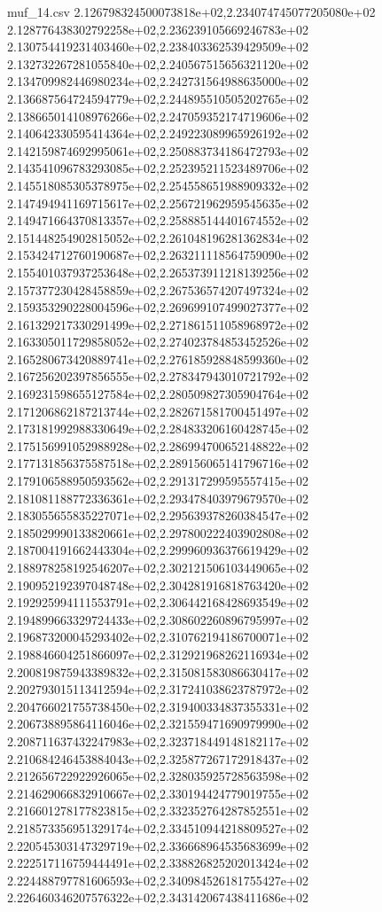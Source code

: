 \begin{filecontents*}{muf_14.csv}
2.126798324500073818e+02,2.234074745077205080e+02
2.128776438302792258e+02,2.236239105669246783e+02
2.130754419231403460e+02,2.238403362539429509e+02
2.132732267281055840e+02,2.240567515656321120e+02
2.134709982446980234e+02,2.242731564988635000e+02
2.136687564724594779e+02,2.244895510505202765e+02
2.138665014108976266e+02,2.247059352174719606e+02
2.140642330595414364e+02,2.249223089965926192e+02
2.142159874692995061e+02,2.250883734186472793e+02
2.143541096783293085e+02,2.252395211523489706e+02
2.145518085305378975e+02,2.254558651988909332e+02
2.147494941169715617e+02,2.256721962959545635e+02
2.149471664370813357e+02,2.258885144401674552e+02
2.151448254902815052e+02,2.261048196281362834e+02
2.153424712760190687e+02,2.263211118564759090e+02
2.155401037937253648e+02,2.265373911218139256e+02
2.157377230428458859e+02,2.267536574207497324e+02
2.159353290228004596e+02,2.269699107499027377e+02
2.161329217330291499e+02,2.271861511058968972e+02
2.163305011729858052e+02,2.274023784853452526e+02
2.165280673420889741e+02,2.276185928848599360e+02
2.167256202397856555e+02,2.278347943010721792e+02
2.169231598655127584e+02,2.280509827305904764e+02
2.171206862187213744e+02,2.282671581700451497e+02
2.173181992988330649e+02,2.284833206160428745e+02
2.175156991052988928e+02,2.286994700652148822e+02
2.177131856375587518e+02,2.289156065141796716e+02
2.179106588950593562e+02,2.291317299595557415e+02
2.181081188772336361e+02,2.293478403979679570e+02
2.183055655835227071e+02,2.295639378260384547e+02
2.185029990133820661e+02,2.297800222403902808e+02
2.187004191662443304e+02,2.299960936376619429e+02
2.188978258192546207e+02,2.302121506103449065e+02
2.190952192397048748e+02,2.304281916818763420e+02
2.192925994111553791e+02,2.306442168428693549e+02
2.194899663329724433e+02,2.308602260896795997e+02
2.196873200045293402e+02,2.310762194186700071e+02
2.198846604251866097e+02,2.312921968262116934e+02
2.200819875943389832e+02,2.315081583086630417e+02
2.202793015113412594e+02,2.317241038623787972e+02
2.204766021755738450e+02,2.319400334837355331e+02
2.206738895864116046e+02,2.321559471690979990e+02
2.208711637432247983e+02,2.323718449148182117e+02
2.210684246453884043e+02,2.325877267172918437e+02
2.212656722922926065e+02,2.328035925728563598e+02
2.214629066832910667e+02,2.330194424779019755e+02
2.216601278177823815e+02,2.332352764287852551e+02
2.218573356951329174e+02,2.334510944218809527e+02
2.220545303147329719e+02,2.336668964535683699e+02
2.222517116759444491e+02,2.338826825202013424e+02
2.224488797781606593e+02,2.340984526181755427e+02
2.226460346207576322e+02,2.343142067438411686e+02

\end{filecontents*}
